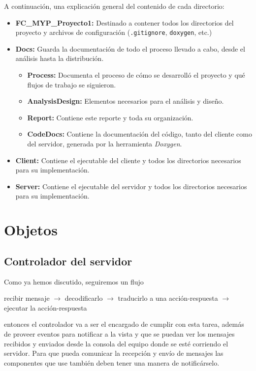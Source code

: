 \vspace{2mm}

A continuación, una explicación general del contenido de cada directorio:

\begin{itemize}
	\item \textbf{FC\_MYP\_Proyecto1:} Destinado a contener todos los directorios del proyecto y archivos de configuración (\texttt{.gitignore}, \texttt{doxygen}, etc.)
	\item \textbf{Docs:} Guarda la documentación de todo el proceso llevado a cabo, desde el análisis hasta la distribución. 
	\begin{itemize}
		\item \textbf{Process:} Documenta el proceso de cómo se desarrolló el proyecto y qué flujos de trabajo se siguieron.
		\item \textbf{AnalysisDesign:} Elementos necesarios para el análisis y diseño.
		\item \textbf{Report:} Contiene este reporte y toda su organización.
		\item \textbf{CodeDocs:} Contiene la documentación del código, tanto del cliente como del servidor, generada por la herramienta \textit{Doxygen}.
	\end{itemize}
	\item \textbf{Client:} Contiene el ejecutable del cliente y todos los directorios necesarios para su implementación.
	\item \textbf{Server:} Contiene el ejecutable del servidor y todos los directorios necesarios para su implementación.
\end{itemize}

\section{Objetos}

\subsection{Controlador del servidor}
Como ya hemos discutido, seguiremos un flujo 
\begin{center}
	recibir mensaje $\to$ decodificarlo $\to$ traducirlo a una acción-respuesta $\to$ ejecutar la acción-respuesta
\end{center}
 entonces el controlador va a ser el encargado de cumplir con esta tarea, además de proveer eventos para notificar a la vista y que se puedan ver los mensajes recibidos y enviados desde la consola del equipo donde se esté corriendo el servidor. Para que pueda comunicar la recepción y envío de mensajes las componentes que use también deben tener una manera de notificárselo.
 \\
 
